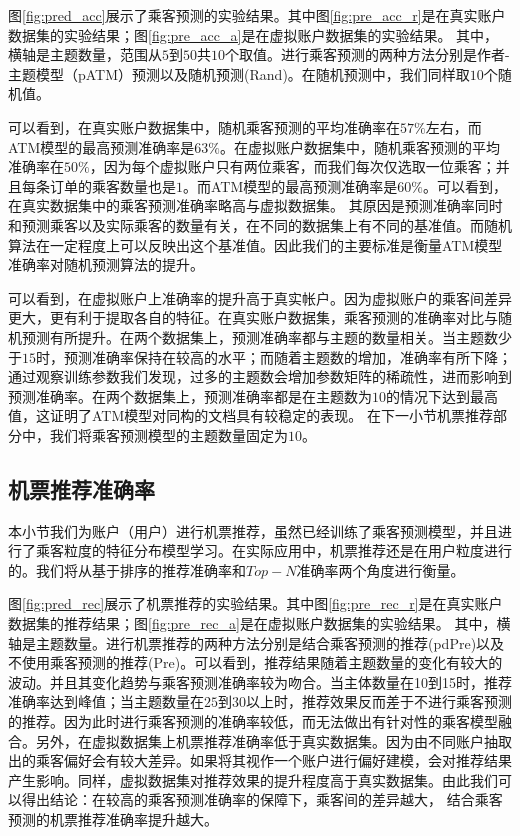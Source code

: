 图\ref{fig:pred_acc}展示了乘客预测的实验结果。其中图\ref{fig:pre_acc_r}是在真实账户数据集的实验结果；图\ref{fig:pre_acc_a}是在虚拟账户数据集的实验结果。
其中，横轴是主题数量，范围从$5$到$50$共$10$个取值。进行乘客预测的两种方法分别是作者-主题模型（pATM）预测以及随机预测(Rand)。在随机预测中，我们同样取$10$个随机值。

可以看到，在真实账户数据集中，随机乘客预测的平均准确率在$57\%$左右，而ATM模型的最高预测准确率是$63\%$。在虚拟账户数据集中，随机乘客预测的平均准确率在$50\%$，因为每个虚拟账户只有两位乘客，而我们每次仅选取一位乘客；并且每条订单的乘客数量也是$1$。而ATM模型的最高预测准确率是$60\%$。可以看到，在真实数据集中的乘客预测准确率略高与虚拟数据集。
其原因是预测准确率同时和预测乘客以及实际乘客的数量有关，在不同的数据集上有不同的基准值。而随机算法在一定程度上可以反映出这个基准值。因此我们的主要标准是衡量ATM模型准确率对随机预测算法的提升。

可以看到，在虚拟账户上准确率的提升高于真实帐户。因为虚拟账户的乘客间差异更大，更有利于提取各自的特征。在真实账户数据集，乘客预测的准确率对比与随机预测有所提升。在两个数据集上，预测准确率都与主题的数量相关。当主题数少于$15$时，预测准确率保持在较高的水平；而随着主题数的增加，准确率有所下降；通过观察训练参数我们发现，过多的主题数会增加参数矩阵的稀疏性，进而影响到预测准确率。在两个数据集上，预测准确率都是在主题数为$10$的情况下达到最高值，这证明了ATM模型对同构的文档具有较稳定的表现。
在下一小节机票推荐部分中，我们将乘客预测模型的主题数量固定为$10$。


\subsection{机票推荐准确率}
本小节我们为账户（用户）进行机票推荐，虽然已经训练了乘客预测模型，并且进行了乘客粒度的特征分布模型学习。在实际应用中，机票推荐还是在用户粒度进行的。我们将从基于排序的推荐准确率和$Top-N$准确率两个角度进行衡量。

\begin{figure}
\centering
{}
\end{figure}

图\ref{fig:pred_rec}展示了机票推荐的实验结果。其中图\ref{fig:pre_rec_r}是在真实账户数据集的推荐结果；图\ref{fig:pre_rec_a}是在虚拟账户数据集的实验结果。
其中，横轴是主题数量。进行机票推荐的两种方法分别是结合乘客预测的推荐(pdPre)以及不使用乘客预测的推荐(Pre)。可以看到，推荐结果随着主题数量的变化有较大的波动。并且其变化趋势与乘客预测准确率较为吻合。当主体数量在10到15时，推荐准确率达到峰值；当主题数量在$25$到$30$以上时，推荐效果反而差于不进行乘客预测的推荐。因为此时进行乘客预测的准确率较低，而无法做出有针对性的乘客模型融合。另外，在虚拟数据集上机票推荐准确率低于真实数据集。因为由不同账户抽取出的乘客偏好会有较大差异。如果将其视作一个账户进行偏好建模，会对推荐结果产生影响。同样，虚拟数据集对推荐效果的提升程度高于真实数据集。由此我们可以得出结论：在较高的乘客预测准确率的保障下，乘客间的差异越大，
结合乘客预测的机票推荐准确率提升越大。


